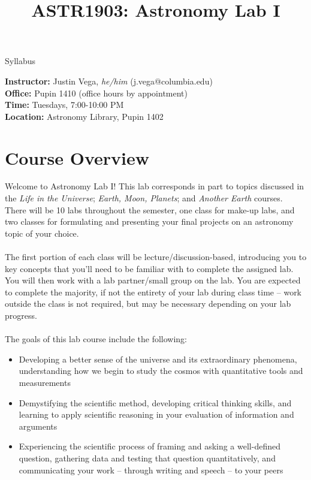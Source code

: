 \documentclass[11pt]{article}
\begin{document}
\thispagestyle{empty}
\title{\vspace{-2.5cm}\textbf{ASTR1903: Astronomy Lab I}}
\date{}
\maketitle
\vspace{-60pt}
\begin{center}
    \Large{Syllabus}
\end{center}
\vspace{12pt}
\noindent
\textbf{Instructor:} Justin Vega, \textit{he/him}
(j.vega@columbia.edu)\\
\textbf{Office:} Pupin 1410 (office hours by appointment)\\ 
\textbf{Time:} {Tuesdays, 7:00-10:00 PM} \\
\textbf{Location:} {Astronomy Library, Pupin 1402 \\}
\vspace{-12pt}
\section*{Course Overview}
Welcome to Astronomy Lab I! This lab corresponds in part to topics discussed in the \textit{Life in the Universe}; \textit{Earth, Moon, Planets}; and \textit{Another Earth} courses. There will be 10 labs throughout the semester, one class for make-up labs, and two classes for formulating and presenting your final projects on an astronomy topic of your choice. \\
\\
The first portion of each class will be lecture/discussion-based, introducing you to key concepts that you'll need to be familiar with to complete the assigned lab. You will then work with a lab partner/small group on the lab. You are expected to complete the majority, if not the entirety of your lab during class time – work outside the class is not required, but may be necessary depending on your lab progress.
\\
\\
\noindent The goals of this lab course include the following:
\begin{itemize}
\item Developing a better sense of the universe and its extraordinary phenomena, understanding how we begin to study the cosmos with quantitative tools and measurements

\item Demystifying the scientific method, developing critical thinking skills, and learning to apply scientific reasoning in your evaluation of information and arguments

\item Experiencing the scientific process of framing and asking a well-defined question, gathering data and testing that question quantitatively, and communicating your work -- through writing and speech -- to your peers
\end{itemize}
\end{document}
